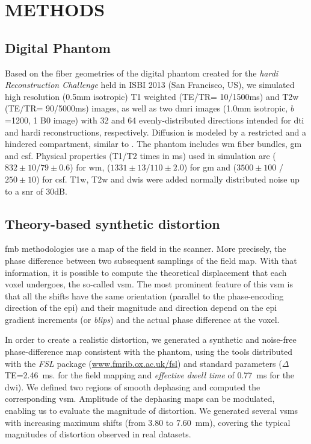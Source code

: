 \section{METHODS}\label{sec:methods}
\subsection{Digital Phantom}\label{sec:phantom}
Based on the fiber geometries of the digital phantom created
  for the \emph{\acrshort*{hardi} Reconstruction Challenge} held
  in ISBI 2013 (San Francisco, US), we simulated high resolution
  (0.5mm isotropic) T1 weighted (TE/TR= 10/1500ms) and T2w
  (TE/TR= 90/5000ms) images, as well as two \gls*{dmri} images
  (1.0mm isotropic, $b$=1200, 1 B0 image) with 32 and 64
  evenly-distributed directions intended for \gls*{dti} and 
  \gls*{hardi} reconstructions, respectively.
Diffusion is modeled by a restricted and a hindered compartment,
  similar to \cite{assaf_composite_2005}.
The phantom includes \gls*{wm} fiber bundles, \gls*{gm} and \gls*{csf}.
Physical properties (T1/T2 times in ms) used in simulation are
  ($832\pm10/79\pm0.6$) for \gls*{wm},
  ($1331\pm13/110\pm2.0$) for \gls*{gm} and
  ($3500\pm100$ / $250\pm10$) for \gls*{csf}.
T1w, T2w and \glspl*{dwi} were added normally distributed noise
  up to a \gls*{snr} of 30dB.

\subsection{Theory-based synthetic distortion}
\label{sec:distortion}
\Gls*{fmb} methodologies use a map of the field in the scanner.
More precisely, the phase difference between two subsequent samplings
  of the field map.
With that information, it is possible to compute the theoretical
  displacement that each voxel undergoes, the so-called \gls*{vsm}.
The most prominent feature of this \gls*{vsm} is that all the shifts
  have the same orientation (parallel to the phase-encoding direction
  of the \gls*{epi}) and their magnitude and direction depend on the 
  \gls*{epi} gradient increments (or \emph{blips})
  and the actual phase difference at the voxel.

In order to create a realistic distortion, we generated a synthetic and noise-free
  phase-difference map consistent with the phantom, using the tools distributed with
  the \emph{FSL} package %
  (\url{www.fmrib.ox.ac.uk/fsl}) and standard parameters ($\Delta$TE=2.46~ms. for the
  field mapping and \emph{effective dwell time} of 0.77~ms for the \gls*{dwi}).
We defined two regions of smooth dephasing and computed the corresponding \gls*{vsm}.
Amplitude of the dephasing maps can be modulated, enabling us to evaluate the
  magnitude of distortion.
We generated several \glspl*{vsm} with increasing maximum shifts (from 3.80 to 7.60~mm),
  covering the typical magnitudes of distortion observed in real datasets.

